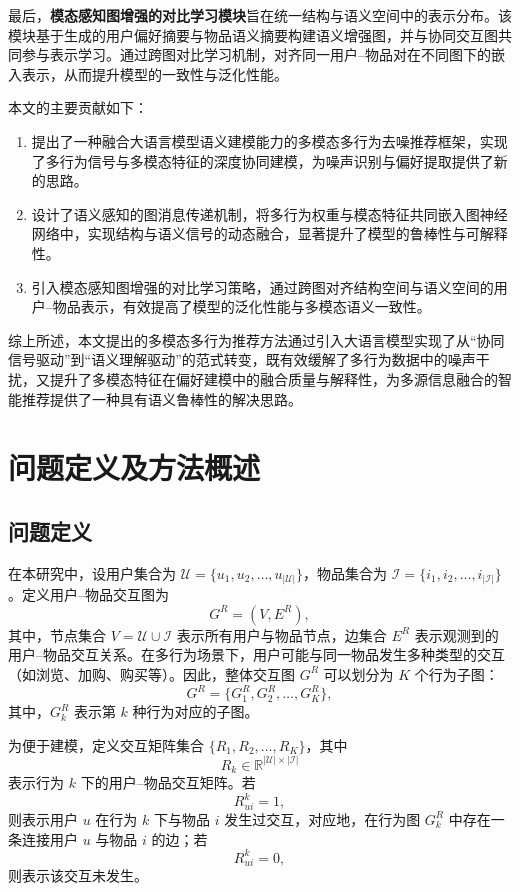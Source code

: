 最后，\textbf{模态感知图增强的对比学习模块}旨在统一结构与语义空间中的表示分布。该模块基于生成的用户偏好摘要与物品语义摘要构建语义增强图，并与协同交互图共同参与表示学习。通过跨图对比学习机制，对齐同一用户–物品对在不同图下的嵌入表示，从而提升模型的一致性与泛化性能。

本文的主要贡献如下：

\begin{enumerate}
    \item 提出了一种融合大语言模型语义建模能力的多模态多行为去噪推荐框架，实现了多行为信号与多模态特征的深度协同建模，为噪声识别与偏好提取提供了新的思路。
    \item 设计了语义感知的图消息传递机制，将多行为权重与模态特征共同嵌入图神经网络中，实现结构与语义信号的动态融合，显著提升了模型的鲁棒性与可解释性。
    \item 引入模态感知图增强的对比学习策略，通过跨图对齐结构空间与语义空间的用户–物品表示，有效提高了模型的泛化性能与多模态语义一致性。
\end{enumerate}

综上所述，本文提出的多模态多行为推荐方法通过引入大语言模型实现了从“协同信号驱动”到“语义理解驱动”的范式转变，既有效缓解了多行为数据中的噪声干扰，又提升了多模态特征在偏好建模中的融合质量与解释性，为多源信息融合的智能推荐提供了一种具有语义鲁棒性的解决思路。


\section{问题定义及方法概述}
\subsection{问题定义}
在本研究中，设用户集合为 $\mathcal{U}=\{u_1, u_2, \ldots, u_{|\mathcal{U}|}\}$，物品集合为 $\mathcal{I}=\{i_1, i_2, \ldots, i_{|\mathcal{I}|}\}$。定义用户–物品交互图为
\begin{equation}
    G^R = (V, E^R),
\end{equation}
其中，节点集合 $V = \mathcal{U} \cup \mathcal{I}$ 表示所有用户与物品节点，边集合 $E^R$ 表示观测到的用户–物品交互关系。在多行为场景下，用户可能与同一物品发生多种类型的交互（如浏览、加购、购买等）。因此，整体交互图 $G^R$ 可以划分为 $K$ 个行为子图：
\begin{equation}
    G^R = \{G^R_1, G^R_2, \ldots, G^R_K\},
\end{equation}
其中，$G^R_k$ 表示第 $k$ 种行为对应的子图。

为便于建模，定义交互矩阵集合 $\{R_1, R_2, \ldots, R_K\}$，其中
\begin{equation}
    R_k \in \mathbb{R}^{|\mathcal{U}| \times |\mathcal{I}|}
\end{equation}
表示行为 $k$ 下的用户–物品交互矩阵。若
\begin{equation}
    R^k_{ui} = 1,
\end{equation}
则表示用户 $u$ 在行为 $k$ 下与物品 $i$ 发生过交互，对应地，在行为图 $G^R_k$ 中存在一条连接用户 $u$ 与物品 $i$ 的边；若
\begin{equation}
    R^k_{ui} = 0,
\end{equation}
则表示该交互未发生。

